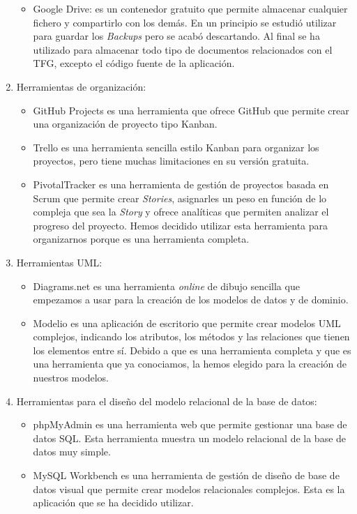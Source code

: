 \documentclass[11pt]{book}
\begin{document}
\begin{enumerate}
\begin{itemize}
		\item Google Drive: es un contenedor gratuito que permite almacenar cualquier fichero y compartirlo con los demás. En un principio se estudió utilizar para guardar los \textit{Backups} pero se acabó descartando. Al final se ha utilizado para almacenar todo tipo de documentos relacionados con el TFG, excepto el código fuente de la aplicación.
	\end{itemize}
	\item Herramientas de organización: 
	\begin{itemize} 
		\item GitHub Projects es una herramienta que ofrece GitHub que permite crear una organización de proyecto tipo Kanban.
		\item Trello es una herramienta sencilla estilo Kanban para organizar los proyectos, pero tiene muchas limitaciones en su versión gratuita.
		\item PivotalTracker es una herramienta de gestión de proyectos basada en Scrum que permite crear \textit{Stories}, asignarles un peso en función de lo compleja que sea la \textit{Story} y ofrece analíticas que permiten analizar el progreso del proyecto. Hemos decidido utilizar esta herramienta para organizarnos porque es una herramienta completa.
	\end{itemize}
	\item Herramientas UML: 
	\begin{itemize} 
		\item Diagrams.net es una herramienta \textit{online} de dibujo sencilla que empezamos a usar para la creación de los modelos de datos y de dominio.
		\item Modelio es una aplicación de escritorio que permite crear modelos UML complejos, indicando los atributos, los métodos y las relaciones que tienen los elementos entre sí. Debido a que es una herramienta completa y que es una herramienta que ya conociamos, la hemos elegido para la creación de nuestros modelos.
	\end{itemize}
	\item Herramientas para el diseño del modelo relacional de la base de datos: 
	\begin{itemize} 
		\item phpMyAdmin es una herramienta web que permite gestionar una base de datos SQL. Esta herramienta muestra un modelo relacional de la base de datos muy simple.
		\item MySQL Workbench es una herramienta de gestión de diseño de base de datos visual que permite crear modelos relacionales complejos. Esta es la aplicación que se ha decidido utilizar.

\end{itemize}
\end{enumerate}
\end{document}
